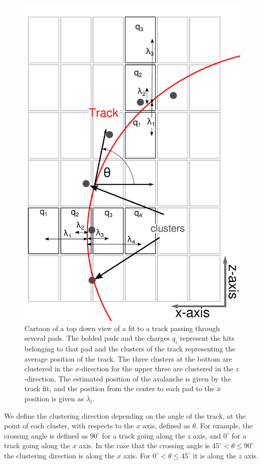\documentclass[review,number,sort&compress]{elsarticle}
\begin{document}
\begin{figure}[ht!]
\centering
\includegraphics[scale=.35]{fig3.pdf}
\caption{Cartoon of a top down view of a fit to a track passing through several pads. The bolded pads and the charges $q_i$ represent the hits belonging to that pad and the clusters of the track representing the average position of the track. The three clusters at the bottom are clustered in the $x$-direction for the upper three are clustered in the $z$-direction. The estimated position of the avalanche is given by the track fit, and the position from the center to each pad to the $\bar{x}$ position is given as $\lambda_i$.}
\label{fig:topview}
\end{figure}

We define the clustering direction depending on the angle of the track, at the point of each cluster, with respects to the $x$ axis, defined as $\theta$. For example, the crossing angle is defined as $90^{\circ}$ for a track going along the $z$ axis, and $0^{\circ}$ for a track going along the $x$ axis. In the case that the crossing angle is $45^{\circ} < \theta \leq 90^{\circ} $ the clustering direction is along the $x$ axis. For $0^{\circ} < \theta \leq 45^{\circ}$ it is along the $z$ axis. 
\end{document}
